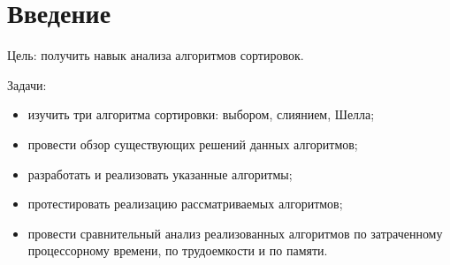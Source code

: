 \chapter*{Введение}

Цель: получить навык анализа алгоритмов сортировок.


Задачи:

\begin{itemize}
	\item изучить три алгоритма сортировки: выбором, слиянием, Шелла;
	\item провести обзор существующих решений данных алгоритмов;
	\item разработать и реализовать указанные алгоритмы;
	\item протестировать реализацию рассматриваемых алгоритмов;
	\item провести сравнительный анализ реализованных алгоритмов по затраченному процессорному времени, по трудоемкости и по памяти.
\end{itemize}